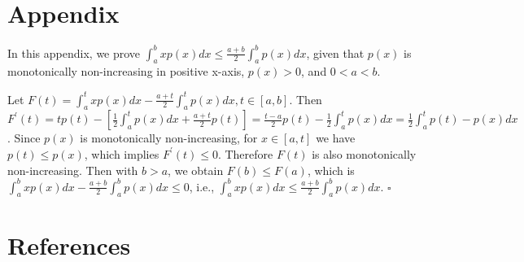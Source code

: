 \documentclass[smallabstract,smallcaptions]{dccpaper}
\begin{document}
\section*{Appendix}
\label{sec:appendix}

In this appendix, we prove $\int_a^b xp(x)dx \le \frac{a+b}{2} \int_a^b p(x)dx$, given that $p(x)$ is monotonically non-increasing in positive x-axis, $p(x) > 0$, and $0 < a < b$.

Let $F(t) = \int_a^t xp(x)dx - \frac{a+t}{2} \int_a^t p(x)dx, t \in [a, b]$. Then $F^{\prime}(t) = tp(t) - [\frac{1}{2}\int_a^t p(x)dx + \frac{a+t}{2}p(t)] = \frac{t-a}{2}p(t) - \frac{1}{2}\int_a^t p(x)dx = \frac{1}{2}\int_a^t p(t)-p(x)dx $. Since $p(x)$ is monotonically non-increasing, for $x \in [a, t]$ we have $p(t) \le p(x)$, which implies $F^{\prime}(t) \le 0$. Therefore $F(t)$ is also monotonically non-increasing. Then with $b > a$, we obtain $F(b) \le F(a)$, which is $\int_a^b xp(x)dx - \frac{a+b}{2} \int_a^b p(x)dx \le 0$, i.e., $\int_a^b xp(x)dx \le \frac{a+b}{2} \int_a^b p(x)dx$. $\square$

\section*{References}


\end{document}
